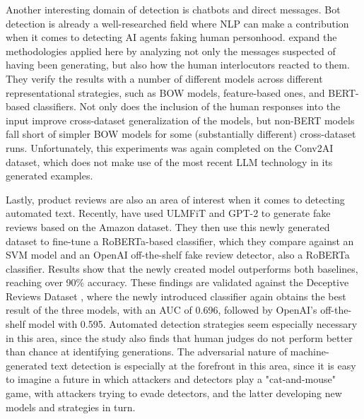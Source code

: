 Another interesting domain of detection is chatbots and direct messages.
Bot detection is already a well-researched field \citep{latah2020detection} where NLP can make a contribution when it comes to detecting AI agents faking human personhood.
\citet{bhatt2021detectingbotgeneratedtextcharacterizing} expand the methodologies applied here by analyzing not only the messages suspected of having been generating, but also how the human interlocutors reacted to them.
They verify the results with a number of different models across different representational strategies, such as BOW models, feature-based ones, and BERT-based classifiers.
Not only does the inclusion of the human responses into the input improve cross-dataset generalization of the models, but non-BERT models fall short of simpler BOW models for some (substantially different) cross-dataset runs.
Unfortunately, this experiments was again completed on the Conv2AI \citep{dinan2019secondconversationalintelligencechallenge} dataset, which does not make use of the most recent LLM technology in its generated examples.

Lastly, product reviews are also an area of interest when it comes to detecting automated text.
Recently, \citet{salminen2022creating} have used ULMFiT \citep{howard2018universal} and GPT-2 to generate fake reviews based on the Amazon \citep{ni2019justifying} dataset.
They then use this newly generated dataset to fine-tune a RoBERTa-based classifier, which they compare against an SVM model and an OpenAI off-the-shelf fake review detector, also a RoBERTa classifier.
Results show that the newly created model outperforms both baselines, reaching over 90\% accuracy.
These findings are validated against the Deceptive Reviews Dataset \citep{ott2011finding}, where the newly introduced classifier again obtains the best result of the three models, with an AUC of 0.696, followed by OpenAI's off-the-shelf model with 0.595.
Automated detection strategies seem especially necessary in this area, since the study also finds that human judges do not perform better than chance at identifying generations.
The adversarial nature of machine-generated text detection is especially at the forefront in this area, since it is easy to imagine a future in which attackers and detectors play a "cat-and-mouse" game, with attackers trying to evade detectors, and the latter developing new models and strategies in turn.
